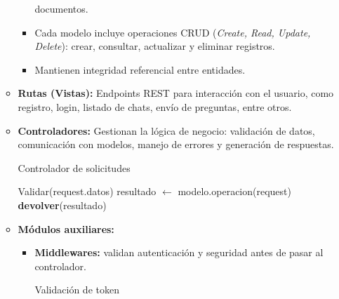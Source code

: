 \begin{enumerate}
\begin{itemize}
\begin{itemize}
                                    documentos.
                              \item Cada modelo incluye operaciones CRUD (\textit{Create, Read, Update, Delete}):
                                    crear, consultar, actualizar y eliminar registros.
                              \item Mantienen integridad referencial entre entidades.
                        \end{itemize}
                  \item \textbf{Rutas (Vistas):} Endpoints REST para interacción con el usuario, como registro, login, listado de chats, envío de preguntas, entre otros.
                  \item \textbf{Controladores:} Gestionan la lógica de negocio: validación de datos, comunicación con modelos,
                        manejo de errores y generación de respuestas.
                        \begin{algorithm}[H]
                              \caption{Controlador de solicitudes}
                              \label{alg:controlador-solicitudes}
                              \begin{algorithmic}[1]
                                    \State Validar(request.datos)
                                    \State resultado $\gets$ modelo.operacion(request)
                                    \State \textbf{devolver}(resultado)
                                    \EndProcedure
                              \end{algorithmic}
                        \end{algorithm}
                  \item \textbf{Módulos auxiliares:}
                        \begin{itemize}
                              \item \textbf{Middlewares:} validan autenticación y seguridad antes de pasar al controlador.
                                    \begin{algorithm}[H]
                                          \caption{Validación de token}
                                          \label{alg:validar-token}
                                          \begin{algorithmic}[1]

\end{algorithmic}
\end{algorithm}
\end{itemize}
\end{itemize}
\end{enumerate}
